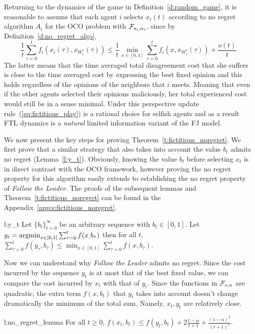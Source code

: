 Returning to the dynamics of the game in Definition~\ref{d:random_game},
it is reasonable to assume that each agent $i$ selects $x_i(t)$ according
to no regret algorithm $A_i$ for the OCO problem with $\mathcal{F}_{s_i,\alpha_i}$,
since by Definition~\ref{d:no_regret_algo},
\[\frac{1}{t}\sum_{\tau=0}^t f_i(x_i(\tau),x_{W_i^\tau}(\tau)) \leq
\frac{1}{t}\min_{x \in [0,1]}\sum_{\tau=0}^tf_i(x,x_{W_i^\tau}(\tau)) + \frac{o(t)}{t}\]
The latter means that the time averaged total disagreement cost
that she suffers is close to the time averaged cost by expressing the
best fixed opinion and this holds regardless of the opinions of the
neighbors that $i$ meets. Meaning that even if the other agents
selected their opinions maliciously, her total experienced cost
would still be in a sense minimal. Under this perspective
update rule~(\ref{eq:fictitious_play}) is a rational choice for
selfish agents and as a result FTL dynamics is 
a \emph{natural} limited information variant of the FJ model.



We now present the key steps for proving Theorem~\ref{t:fictitious_noregret}.
We first prove that a similar strategy that also takes into
account the value $b_t$ admits no regret (Lemma~\ref{l:y_t}).
Obviously, knowing the value $b_t$ before selecting $x_t$
is in direct contrast with the OCO framework, however proving
the no regret property for this algorithm easily extends to
establishing the no regret property of \emph{Follow the Leader}.
The proofs of the subsequent lemmas and Theorem~\ref{t:fictitious_noregret} can
be found in the Appendix~\ref{app:s:fictitious_noregret}.
\begin{replemma}{l:y_t}
Let $\{b_t\}_{t=0}^\infty$ be an arbitrary sequence with $b_t \in [0,1]$.
Let $y_t = \operatorname*{argmin}_{x \in [0,1]}\sum_{\tau=0}^tf(x_,b_\tau)$
then for all $t$,
\(
\sum_{\tau=0}^t f(y_\tau,b_\tau) \leq \min_{x \in [0,1]}
\sum_{\tau = 0}^tf(x,b_\tau).
\)
\end{replemma}
Now we can understand why \emph{Follow the Leader}
admits no regret. Since the cost incurred by the sequence $y_t$ is at most that
of the best fixed value, we can compare the cost incurred by $x_t$ with
that of $y_t$.  Since the functions in $\mathcal{F}_{s,\alpha}$ are quadratic,
the extra term $f(x,b_t)$ that $y_t$ takes into account doesn't change
dramatically the minimum of the total sum. Namely, $x_t,y_t$
are relatively close.
\begin{replemma}{l:no_regret_lemma}
  For all $t\geq 0$,
  \(
    f(x_t,b_t) \leq f(y_t,b_t) + 2\frac{1-\alpha}{t+1} +
    \frac{(1-\alpha)^2}{(t+1)^2}
  \).
\end{replemma}
